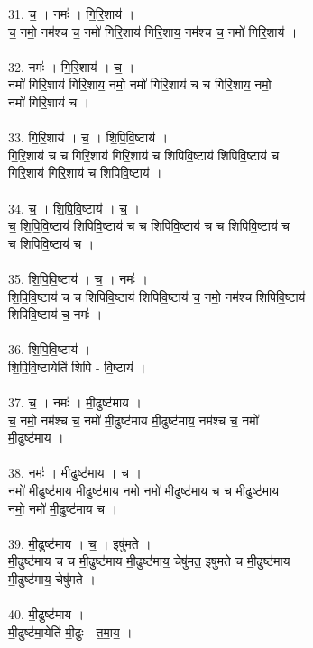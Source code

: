 31. च॒ । नमः॑ । गि॒रि॒शाय॑ ।\\
च॒ नमो॒ नम॑श्च च॒ नमो॑ गिरि॒शाय॑ गिरि॒शाय॒ नम॑श्च च॒ नमो॑ गिरि॒शाय॑ ।\\
\\
32. नमः॑ । गि॒रि॒शाय॑ । च॒ ।\\
नमो॑ गिरि॒शाय॑ गिरि॒शाय॒ नमो॒ नमो॑ गिरि॒शाय॑ च च गिरि॒शाय॒ नमो॒\\
नमो॑ गिरि॒शाय॑ च ।\\
\\
33. गि॒रि॒शाय॑ । च॒ । शि॒पि॒वि॒ष्टाय॑ ।\\
गि॒रि॒शाय॑ च च गिरि॒शाय॑ गिरि॒शाय॑ च शिपिवि॒ष्टाय॑ शिपिवि॒ष्टाय॑ च\\
गिरि॒शाय॑ गिरि॒शाय॑ च शिपिवि॒ष्टाय॑ ।\\
\\
34. च॒ । शि॒पि॒वि॒ष्टाय॑ । च॒ ।\\
च॒ शि॒पि॒वि॒ष्टाय॑ शिपिवि॒ष्टाय॑ च च शिपिवि॒ष्टाय॑ च च शिपिवि॒ष्टाय॑ च\\
च शिपिवि॒ष्टाय॑ च ।\\
\\
35. शि॒पि॒वि॒ष्टाय॑ । च॒ । नमः॑ ।\\
शि॒पि॒वि॒ष्टाय॑ च च शिपिवि॒ष्टाय॑ शिपिवि॒ष्टाय॑ च॒ नमो॒ नम॑श्च शिपिवि॒ष्टाय॑\\
शिपिवि॒ष्टाय॑ च॒ नमः॑ ।\\
\\
36. शि॒पि॒वि॒ष्टाय॑ ।\\
शि॒पि॒वि॒ष्टायेति॑ शिपि - वि॒ष्टाय॑ ।\\
\\
37. च॒ । नमः॑ । मी॒ढुष्ट॑माय ।\\
च॒ नमो॒ नम॑श्च च॒ नमो॑ मी॒ढुष्ट॑माय मी॒ढुष्ट॑माय॒ नम॑श्च च॒ नमो॑\\
मी॒ढुष्ट॑माय ।\\
\\
38. नमः॑ । मी॒ढुष्ट॑माय । च॒ ।\\
नमो॑ मी॒ढुष्ट॑माय मी॒ढुष्ट॑माय॒ नमो॒ नमो॑ मी॒ढुष्ट॑माय च च मी॒ढुष्ट॑माय॒\\
नमो॒ नमो॑ मी॒ढुष्ट॑माय च ।\\
\\
39. मी॒ढुष्ट॑माय । च॒ । इषु॑मते ।\\
मी॒ढुष्ट॑माय च च मी॒ढुष्ट॑माय मी॒ढुष्ट॑माय॒ चेषु॑मत॒ इषु॑मते च मी॒ढुष्ट॑माय\\
मी॒ढुष्ट॑माय॒ चेषु॑मते ।\\
\\
40. मी॒ढुष्ट॑माय ।\\
मी॒ढुष्ट॑मा॒येति॑ मी॒ढुः - त॒मा॒य॒ ।\\
